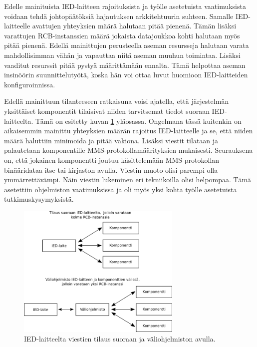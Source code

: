 Edelle mainituista IED-laitteen rajoituksista ja työlle asetetuista vaatimuksista voidaan tehdä johtopäätöksiä hajautuksen arkkitehtuurin suhteen. Samalle IED-laitteelle avattujen yhteyksien määrä halutaan pitää pienenä. Tämän lisäksi varattujen RCB-instanssien määrä jokaista datajoukkoa kohti halutaan myös pitää pienenä. Edellä mainittujen perusteella aseman resursseja halutaan varata mahdollisimman vähän ja vapauttaa niitä aseman muuhun toimintaa. Lisäksi vaaditut resurssit pitää pystyä määrittämään ennalta. Tämä helpottaa aseman insinöörin suunnittelutyötä, koska hän voi ottaa luvut huomioon IED-laitteiden konfiguroinnissa.

Edellä mainittuun tilanteeseen ratkaisuna voisi ajatella, että järjestelmän yksittäiset komponentit tilaisivat niiden tarvitsemat tiedot suoraan IED-laitteelta. Tämä on esitetty kuvan \ref{fig:architecture-analysis} yläosassa. Ongelmana tässä kuitenkin on aikaisemmin mainittu yhteyksien määrän rajoitus IED-laitteelle ja se, että niiden määrä haluttiin minimoida ja pitää vakiona. Lisäksi viestit tilataan ja palautetaan komponentille MMS-protokollamäärityksien mukaisesti. Seurauksena on, että jokainen komponentti joutuu käsittelemään MMS-protokollan binääridataa itse tai kirjaston avulla. Viestin muoto olisi parempi olla ymmärrettävämpi. Näin viestin lukeminen eri tekniikoilla olisi helpompaa. Tämä asetettiin ohjelmiston vaatimuksissa ja oli myös yksi kohta työlle asetetuista tutkimuskysymyksistä.

\begin{figure}[ht!]
	\includegraphics[width=0.7\textwidth]{pictures/architecture-analysis.png}
	\caption{IED-laitteelta viestien tilaus suoraan ja väliohjelmiston avulla.}
	\label{fig:architecture-analysis}
\end{figure}

